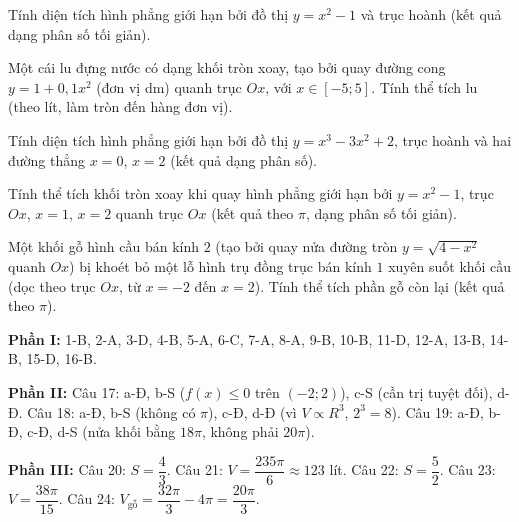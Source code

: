 \cauhoi Tính diện tích hình phẳng giới hạn bởi đồ thị $y=x^2-1$ và trục hoành (kết quả dạng phân số tối giản).

\cauhoi Một cái lu đựng nước có dạng khối tròn xoay, tạo bởi quay đường cong $y=1+0{,}1x^2$ (đơn vị dm) quanh trục $Ox$, với $x\in[-5;5]$. Tính thể tích lu (theo lít, làm tròn đến hàng đơn vị).

\cauhoi Tính diện tích hình phẳng giới hạn bởi đồ thị $y=x^3-3x^2+2$, trục hoành và hai đường thẳng $x=0$, $x=2$ (kết quả dạng phân số).

\cauhoi Tính thể tích khối tròn xoay khi quay hình phẳng giới hạn bởi $y=x^2-1$, trục $Ox$, $x=1$, $x=2$ quanh trục $Ox$ (kết quả theo $\pi$, dạng phân số tối giản).

\cauhoi Một khối gỗ hình cầu bán kính $2$ (tạo bởi quay nửa đường tròn $y=\sqrt{4-x^2}$ quanh $Ox$) bị khoét bỏ một lỗ hình trụ đồng trục bán kính $1$ xuyên suốt khối cầu (dọc theo trục $Ox$, từ $x=-2$ đến $x=2$). Tính thể tích phần gỗ còn lại (kết quả theo $\pi$).

\clearpage
\begin{hopchuy}[Đáp án]
\textbf{Phần I:} 1-B, 2-A, 3-D, 4-B, 5-A, 6-C, 7-A, 8-A, 9-B, 10-B, 11-D, 12-A, 13-B, 14-B, 15-D, 16-B.

\textbf{Phần II:} Câu 17: a-Đ, b-S ($f(x)\le0$ trên $(-2;2)$), c-S (cần trị tuyệt đối), d-Đ. \quad Câu 18: a-Đ, b-S (không có $\pi$), c-Đ, d-Đ (vì $V\propto R^3$, $2^3=8$). \quad Câu 19: a-Đ, b-Đ, c-Đ, d-S (nửa khối bằng $18\pi$, không phải $20\pi$).

\textbf{Phần III:} Câu 20: $S=\dfrac43$. \quad Câu 21: $V=\dfrac{235\pi}{6}\approx123$ lít. \quad Câu 22: $S=\dfrac52$. \quad Câu 23: $V=\dfrac{38\pi}{15}$. \quad Câu 24: $V_{\text{gỗ}}=\dfrac{32\pi}{3}-4\pi=\dfrac{20\pi}{3}$.
\end{hopchuy}

\newpage
